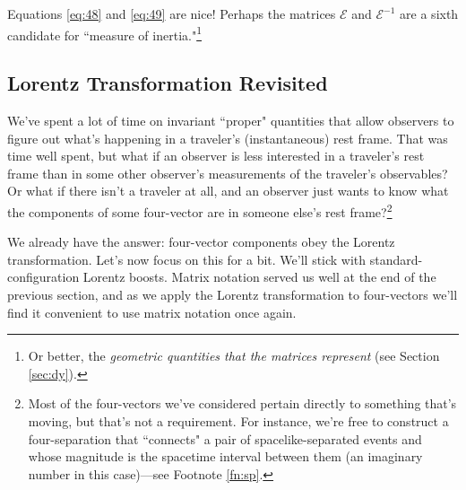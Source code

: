 \documentclass[12pt]{article}
\begin{document}
Equations \ref{eq:48} and \ref{eq:49} are nice! Perhaps the matrices $\mathcal{E}$ and $\mathcal{E}^{-1}$ are a sixth candidate for ``measure of inertia."\footnote{Or better, the \emph{geometric quantities that the matrices represent} (see Section \ref{sec:dy}).}



\subsection{Lorentz Transformation Revisited}

We've spent a lot of time on invariant ``proper" quantities that allow observers to figure out what's happening in a traveler's (instantaneous) rest frame. That was time well spent, but what if an observer is less interested in a traveler's rest frame than in some other observer's measurements of the traveler's observables? Or what if there isn't a traveler at all, and an observer just wants to know what the components of some four-vector are in someone else's rest frame?\footnote{Most of the four-vectors we've considered pertain directly to something that's moving, but that's not a requirement. For instance, we're free to construct a four-separation that ``connects" a pair of spacelike-separated events and whose magnitude is the spacetime interval between them (an imaginary number in this case)---see Footnote \ref{fn:sp}.}

We already have the answer: four-vector components obey the Lorentz transformation. Let's now focus on this for a bit. We'll stick with standard-configuration Lorentz boosts. Matrix notation served us well at the end of the previous section, and as we apply the Lorentz transformation to four-vectors we'll find it convenient to use matrix notation once again.
\end{document}
